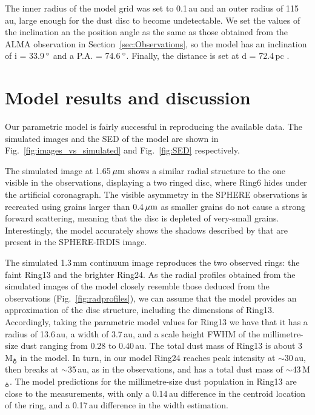 \documentclass[letters,usenatbib,times]{mnras}
\begin{document}
The inner radius of the model grid was set to 0.1\,au and an outer radius of 115\,au, large enough for the dust disc to become undetectable. We set the values of the inclination an the position angle as the same as those obtained from the ALMA observation in Section~\ref{sec:Observations}, so the model has an inclination of i = 33.9\,$\hbox{$^\circ$}$ and a P.A. = 74.6\,$\hbox{$^\circ$}$. Finally, the distance is set at d = 72.4\,pc \citep{Gaia}.

\section{Model results and discussion} \label{sec:results}

Our parametric model is fairly successful in reproducing the available data. The simulated images and the SED of the model are shown in Fig.~\ref{fig:images_vs_simulated} and Fig.~\ref{fig:SED} respectively.

The simulated image at 1.65\,$\hbox{$\mu$m}$ shows a similar radial structure to the one visible in the observations, displaying a two ringed disc, where Ring6 hides under the artificial coronagraph. The visible asymmetry in the SPHERE observations is recreated using grains larger than 0.4\,$\hbox{$\mu$m}$ as smaller grains do not cause a strong forward scattering, meaning that the disc is depleted of very-small grains. Interestingly, the model accurately shows the shadows described by \citet{dOrazi} that are present in the SPHERE-IRDIS image.

The simulated 1.3\,mm continuum image reproduces the two observed rings: the faint Ring13 and the brighter Ring24. As the radial profiles obtained from the simulated images of the model closely resemble those deduced from the observations (Fig.~\ref{fig:radprofiles}), we can assume that the model provides an approximation of the disc structure, including the dimensions of Ring13. Accordingly, taking the parametric model values for Ring13 we have that it has a radius of 13.6\,au, a width of 3.7\,au, and a scale height FWHM of the millimetre-size dust ranging from 0.28 to 0.40\,au. The total dust mass of Ring13 is about 3\,M$_{\earth}$ in the model. In turn, in our model Ring24 reaches peak intensity at $\sim$30\,au, then breaks at $\sim$35\,au, as in the observations, and has a total dust mass of $\sim$43\,M$_{\earth}$. The model predictions for the millimetre-size dust population in Ring13 are close to the measurements, with only a 0.14\,au difference in the centroid location of the ring, and a 0.17\,au difference in the width estimation.
\end{document}
